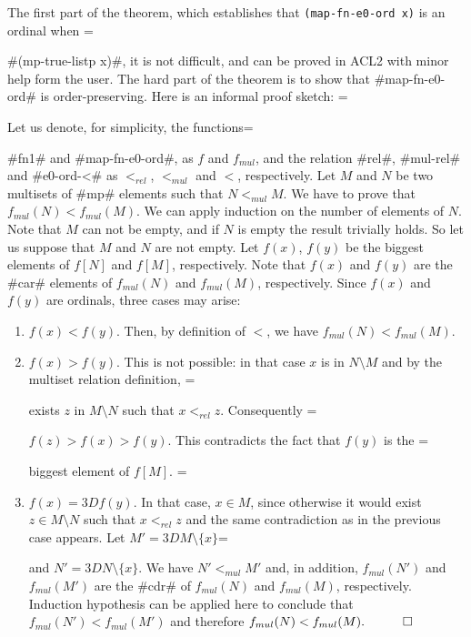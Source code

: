 \documentclass[11pt]{llncs}
\begin{document}
{The first part of the theorem,
which establishes that {\tt (map\--fn\--e0\--ord x)} is an ordinal when =

#(mp-true-listp x)#, it is not difficult, and can be proved in ACL2 with
minor help form the user. The hard part of the theorem is to show that
#map-fn-e0-ord# is order-preserving. Here is an informal proof sketch: =

\vspace{1cm}

 Let us denote, for simplicity, the functions=

#fn1# and #map-fn-e0-ord#, as $f$ and $f_{mul}$, and the relation #rel#,
#mul-rel# and #e0-ord-<# as $<_{rel}$, $<_{mul}$ and $<$,
respectively. Let $M$ and $N$ be two multisets of #mp# elements such
that $N<_{mul}M$. We have to prove that $f_{mul}(N)<f_{mul}(M)$. We can
apply induction on the number of elements of $N$.
Note that $M$ can not be empty, and if $N$ is empty the result trivially
holds. So let us suppose that $M$ and $N$ are not empty. Let $f(x)$,
$f(y)$ be the biggest elements of $f[N]$ and $f[M]$, respectively. Note
that $f(x)$ and $f(y)$ are the #car# elements of $f_{mul}(N)$ and
$f_{mul}(M)$, respectively. Since $f(x)$ and $f(y)$ are ordinals, three
cases may arise:

\begin{enumerate}

\item $f(x) < f(y)$. Then, by definition of $<$, we have
$f_{mul}(N)<f_{mul}(M)$.

\item $f(x) > f(y)$. This is not possible: in that case $x$ is in
$N\setminus M$ and by the multiset relation definition, =

exists $z$ in $M\setminus N$ such that $x <_{rel} z$. Consequently =

$f(z) > f(x) > f(y)$. This contradicts the fact that $f(y)$ is the =

biggest element of $f[M]$. =


\item $f(x) =3D f(y)$. In that case, $x\in M$, since otherwise it would
exist $z\in M\setminus N$ such that $x <_{rel} z$ and the same
contradiction as in the previous case appears. Let $M'=3DM\setminus\{x\}$=

and $N'=3DN\setminus\{x\}$. We have $N' <_{mul} M'$ and, in addition,
$f_{mul}(N')$ and $f_{mul}(M')$ are the #cdr# of $f_{mul}(N)$ and
$f_{mul}(M)$, respectively.  Induction hypothesis can be applied here to
conclude that $f_{mul}(N') < f_{mul}(M')$ and therefore $f_{mul}(N) <
f_{mul}(M).\quad\qed$
\end{enumerate}


}
\end{document}
